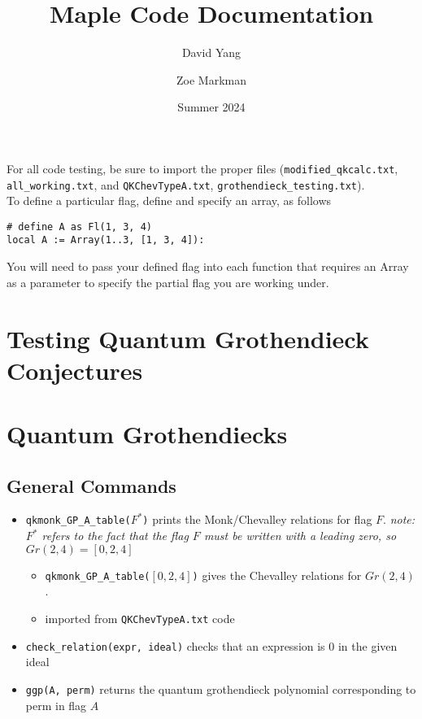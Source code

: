 \documentclass[11pt]{article}
\begin{document}
\title{\textbf{Maple Code Documentation}}
\author{David Yang \and Zoe Markman}
\date{Summer 2024}

\maketitle

For all code testing, be sure to import the proper files (\texttt{modified\_qkcalc.txt}, \texttt{all\_working.txt}, and \texttt{QKChevTypeA.txt}, \texttt{grothendieck\_testing.txt}). \\

To define a particular flag, define and specify an array, as follows
\begin{lstlisting}[language = Maple]
# define A as Fl(1, 3, 4)
local A := Array(1..3, [1, 3, 4]):
\end{lstlisting}

You will need to pass your defined flag into each function that requires an Array as a parameter to specify the partial flag you are working under.

\section{Testing Quantum Grothendieck Conjectures}

\section{Quantum Grothendiecks}
    \subsection{General Commands}
    \begin{itemize}
        \item \texttt{qkmonk\_GP\_A\_table($F^*$)} prints the Monk/Chevalley relations for flag $F$. \textit{note: $F^*$ refers to the fact that the flag $F$ must be written with a leading zero, so $Gr(2, 4) = [0, 2, 4]$}
        \begin{itemize}
            \item \texttt{qkmonk\_GP\_A\_table($[0, 2, 4]$)} gives the Chevalley relations for $Gr(2, 4)$. 
            \item imported from \texttt{QKChevTypeA.txt} code
        \end{itemize}
        \item \texttt{check\_relation(expr, ideal)} checks that an expression is $0$ in the given ideal
        \item \texttt{ggp(A, perm)} returns the quantum grothendieck polynomial corresponding to perm in flag $A$
    \end{itemize}
    
\end{document}
